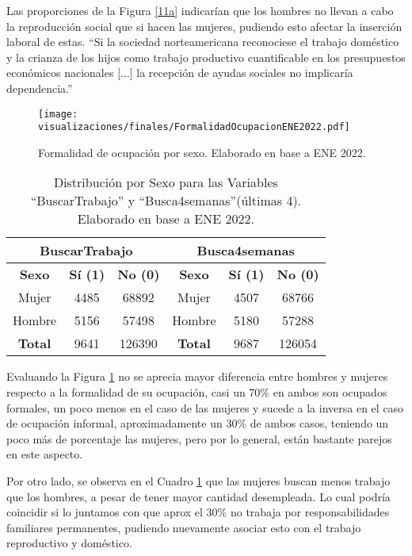 Las proporciones de la Figura \ref{11a} indicarían que los hombres no llevan a cabo la reproducción social que si hacen las mujeres, pudiendo esto afectar la inserción laboral de estas. ``Si la sociedad norteamericana reconociese el trabajo doméstico y la crianza de los 
hijos como trabajo productivo cuantificable en los presupuestos económicos nacionales [...] la recepción de ayudas sociales no implicaría dependencia.'' \citep{Federici2013}

\FloatBarrier

\begin{figure}[htbp]
	\centering
	\texttt{[image: visualizaciones/finales/FormalidadOcupacionENE2022.pdf]}
	\caption{Formalidad de ocupación por sexo. Elaborado en base a ENE 2022.}
	\label{12fig} 
\end{figure}

\FloatBarrier

\begin{table}[htbp]
	\centering
	
	\begin{tabular}{|c|c|c|c|c|c|}
		\hline
		\multicolumn{3}{|c|}{\textbf{BuscarTrabajo}} & \multicolumn{3}{c|}{\textbf{Busca4semanas}} \\
		\hline
		\textbf{Sexo} & \textbf{Sí (1)} & \textbf{No (0)} & \textbf{Sexo} & \textbf{Sí (1)} & \textbf{No (0)} \\
		\hline
		Mujer & 4485 & 68892 & Mujer & 4507 & 68766 \\
		Hombre & 5156 & 57498 & Hombre & 5180 & 57288 \\
		\hline
		\textbf{Total} & 9641 & 126390 & \textbf{Total} & 9687 & 126054 \\
		\hline
	\end{tabular}
	\caption{Distribución por Sexo para las Variables ``BuscarTrabajo'' y ``Busca4semanas''(últimas 4). Elaborado en base a ENE 2022.}
	\label{tab:distribucion_sexo_2}
\end{table}

\FloatBarrier

Evaluando la Figura \ref{12fig} no se aprecia mayor diferencia entre hombres y mujeres respecto a la formalidad de su ocupación, casi un 70\% en ambos son ocupados formales, un poco menos en el caso de las mujeres y sucede a la inversa en el caso de ocupación informal, aproximadamente un 30\% de ambos casos, teniendo un poco más de porcentaje las mujeres, pero por lo general, están bastante parejos en este aspecto.

Por otro lado, se observa en el Cuadro \ref{tab:distribucion_sexo_2} que las mujeres buscan menos trabajo que los hombres, a pesar de tener mayor cantidad desempleada. Lo cual podría coincidir si lo juntamos con que aprox el 30\% no trabaja por responsabilidades familiares permanentes, pudiendo nuevamente asociar esto con el trabajo reproductivo y doméstico.

